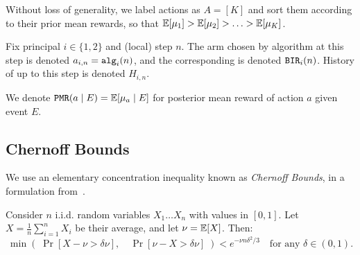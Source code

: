  Without loss of generality, we label actions as $A=[K]$ and sort them according to their prior mean rewards, so that
    $ \E[\mu_1] > \E[\mu_2] > \ldots > \E[\mu_K]$.

Fix principal $i\in \{1,2\}$ and (local) step $n$. The arm chosen by algorithm \alg[i] at this step is denoted $a_{i,n} = \alg[i](n)$, and the corresponding \BIR is denoted $\BIR_i(n)$. History of \alg[i] up to this step is denoted $H_{i,n}$.

We denote
    $\PMR(a\mid E) = \E[\mu_a \mid E]$
for posterior mean reward of action $a$ given event $E$.


\subsection{Chernoff Bounds}

We use an elementary concentration inequality known as {\em Chernoff Bounds}, in a formulation from~\cite{MitzUpfal-book05}.
\begin{theorem}
\label{thm:chernoff}
Consider $n$ i.i.d. random variables $X_1 \ldots X_n$ with values in $[0,1]$. Let
    $X = \tfrac{1}{n} \sum_{i=1}^n X_i$ be their average, and let $\nu = \E[X]$. Then:
\[ \min\left(\; \Pr[ X-\nu > \delta \nu ],\quad
                \Pr[ \nu-X > \delta \nu ]
    \; \right)
    < e^{-\nu n \delta^2/3}
    \quad \text{for any $\delta\in (0,1)$.}
\]
\end{theorem}




